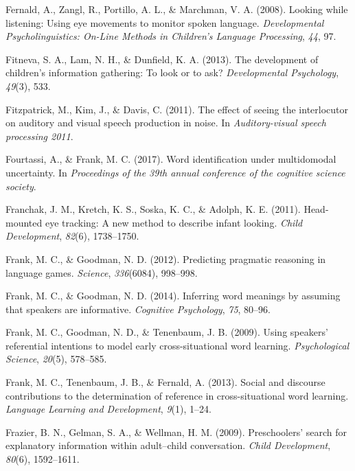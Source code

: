 \documentclass[oneside]{report}
\begin{document}
\hypertarget{ref-fernald2008looking}{}
Fernald, A., Zangl, R., Portillo, A. L., \& Marchman, V. A. (2008).
Looking while listening: Using eye movements to monitor spoken language.
\emph{Developmental Psycholinguistics: On-Line Methods in Children's
Language Processing}, \emph{44}, 97.

\hypertarget{ref-fitneva2013development}{}
Fitneva, S. A., Lam, N. H., \& Dunfield, K. A. (2013). The development
of children's information gathering: To look or to ask?
\emph{Developmental Psychology}, \emph{49}(3), 533.

\hypertarget{ref-fitzpatrick2011effect}{}
Fitzpatrick, M., Kim, J., \& Davis, C. (2011). The effect of seeing the
interlocutor on auditory and visual speech production in noise. In
\emph{Auditory-visual speech processing 2011}.

\hypertarget{ref-fourtassiword2018}{}
Fourtassi, A., \& Frank, M. C. (2017). Word identification under
multidomodal uncertainty. In \emph{Proceedings of the 39th annual
conference of the cognitive science society}.

\hypertarget{ref-franchak2011head}{}
Franchak, J. M., Kretch, K. S., Soska, K. C., \& Adolph, K. E. (2011).
Head-mounted eye tracking: A new method to describe infant looking.
\emph{Child Development}, \emph{82}(6), 1738--1750.

\hypertarget{ref-frank2012predicting}{}
Frank, M. C., \& Goodman, N. D. (2012). Predicting pragmatic reasoning
in language games. \emph{Science}, \emph{336}(6084), 998--998.

\hypertarget{ref-frank2014inferring}{}
Frank, M. C., \& Goodman, N. D. (2014). Inferring word meanings by
assuming that speakers are informative. \emph{Cognitive Psychology},
\emph{75}, 80--96.

\hypertarget{ref-frank2009using}{}
Frank, M. C., Goodman, N. D., \& Tenenbaum, J. B. (2009). Using
speakers' referential intentions to model early cross-situational word
learning. \emph{Psychological Science}, \emph{20}(5), 578--585.

\hypertarget{ref-frank2013social}{}
Frank, M. C., Tenenbaum, J. B., \& Fernald, A. (2013). Social and
discourse contributions to the determination of reference in
cross-situational word learning. \emph{Language Learning and
Development}, \emph{9}(1), 1--24.

\hypertarget{ref-frazier2009preschoolers}{}
Frazier, B. N., Gelman, S. A., \& Wellman, H. M. (2009). Preschoolers'
search for explanatory information within adult--child conversation.
\emph{Child Development}, \emph{80}(6), 1592--1611.
\end{document}
